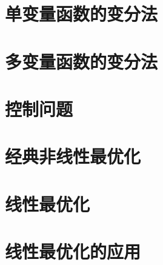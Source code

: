 \chapter{单变量函数的变分法}








\chapter{多变量函数的变分法}



\chapter{控制问题}




\chapter{经典非线性最优化}








\chapter{线性最优化}








\chapter{线性最优化的应用}





